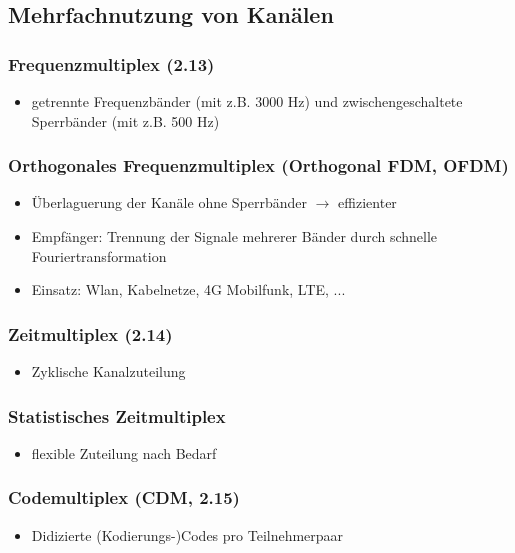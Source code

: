\subsection{Mehrfachnutzung von Kanälen}
\subsubsection{Frequenzmultiplex (2.13)}
\begin{itemize}
	\item getrennte Frequenzbänder (mit z.B. 3000 Hz) und zwischengeschaltete Sperrbänder (mit z.B. 500 Hz)
\end{itemize}

\subsubsection{Orthogonales Frequenzmultiplex (Orthogonal FDM, OFDM)}
\begin{itemize}
	\item Überlaguerung der Kanäle ohne Sperrbänder \(\to\) effizienter
	\item Empfänger: Trennung der Signale mehrerer Bänder durch schnelle Fouriertransformation
	\item Einsatz: Wlan, Kabelnetze, 4G Mobilfunk, LTE, ...
\end{itemize}

\subsubsection{Zeitmultiplex (2.14)}
\begin{itemize}
	\item Zyklische Kanalzuteilung
\end{itemize}

\subsubsection{Statistisches Zeitmultiplex}
\begin{itemize}
	\item flexible Zuteilung nach Bedarf
\end{itemize}

\subsubsection{Codemultiplex (CDM, 2.15)}
\begin{itemize}
	\item Didizierte (Kodierungs-)Codes pro Teilnehmerpaar
\end{itemize}


